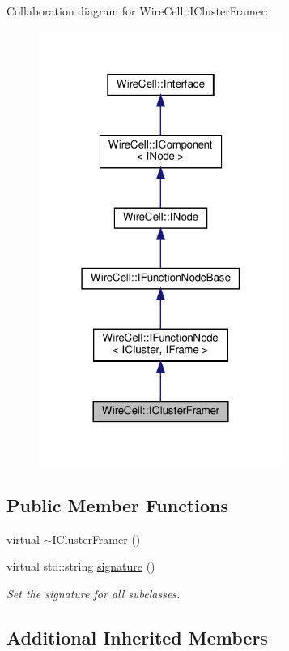 Collaboration diagram for Wire\+Cell\+:\+:I\+Cluster\+Framer\+:
\nopagebreak
\begin{figure}[H]
\begin{center}
\leavevmode
\includegraphics[width=226pt]{class_wire_cell_1_1_i_cluster_framer__coll__graph}
\end{center}
\end{figure}
\subsection*{Public Member Functions}
\begin{DoxyCompactItemize}
\item 
virtual \hyperlink{class_wire_cell_1_1_i_cluster_framer_a4a0993899a22dbb7391fbee7868c732b}{$\sim$\+I\+Cluster\+Framer} ()
\item 
virtual std\+::string \hyperlink{class_wire_cell_1_1_i_cluster_framer_a9609083f2abb8a7fea192970140f165d}{signature} ()
\begin{DoxyCompactList}\small\item\em Set the signature for all subclasses. \end{DoxyCompactList}\end{DoxyCompactItemize}
\subsection*{Additional Inherited Members}


